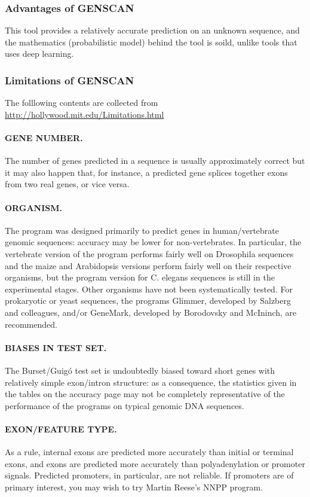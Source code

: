 \documentclass[en,black,10pt,normal]{elegantnote}
\begin{document}
\subsubsection{Advantages of GENSCAN}
This tool provides a relatively accurate prediction on an unknown sequence,
and the mathematics (probabilistic model) behind the tool is soild, unlike tools that 
uses deep learning.

\subsubsection{Limitations of GENSCAN}
The folllowing contents are collected from \url{http://hollywood.mit.edu/Limitations.html}
\paragraph{GENE NUMBER.} The number of genes predicted in a sequence is usually approximately correct but it may also happen that, for instance, a predicted gene splices together exons from two real genes, or vice versa.

\paragraph{ORGANISM.} The program was designed primarily to predict genes in human/vertebrate genomic sequences: accuracy may be lower for non-vertebrates. In particular, the vertebrate version of the program performs fairly well on Drosophila sequences and the maize and Arabidopsis versions perform fairly well on their respective organisms, but the program version for C. elegans sequences is still in the experimental stages. Other organisms have not been systematically tested. For prokaryotic or yeast sequences, the programs Glimmer, developed by Salzberg and colleagues, and/or GeneMark, developed by Borodovsky and McIninch, are recommended.

\paragraph{BIASES IN TEST SET.} The Burset/Guigó test set is undoubtedly biased toward short genes with relatively simple exon/intron structure: as a consequence, the statistics given in the tables on the accuracy page may not be completely representative of the performance of the programs on typical genomic DNA sequences.

\paragraph{EXON/FEATURE TYPE.} As a rule, internal exons are predicted more accurately than initial or terminal exons, and exons are predicted more accurately than polyadenylation or promoter signals. Predicted promoters, in particular, are not reliable. If promoters are of primary interest, you may wish to try Martin Reese's NNPP program.
\end{document}
